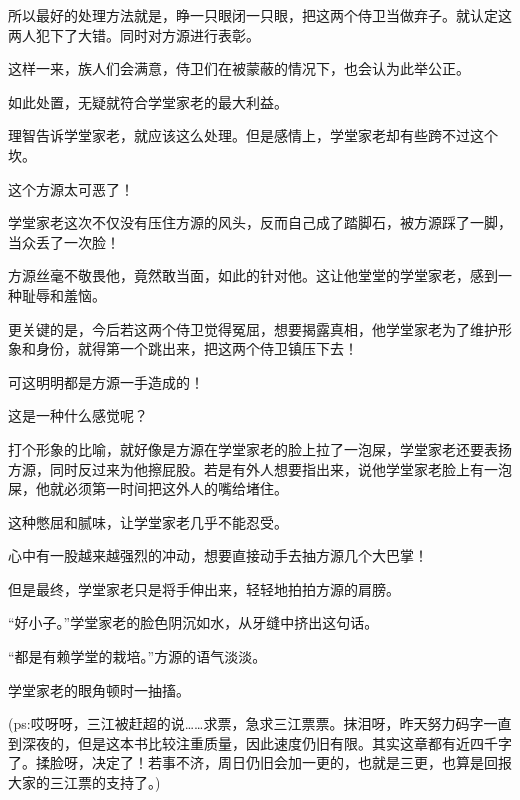 \begin{this_body}
所以最好的处理方法就是，睁一只眼闭一只眼，把这两个侍卫当做弃子。就认定这两人犯下了大错。同时对方源进行表彰。

这样一来，族人们会满意，侍卫们在被蒙蔽的情况下，也会认为此举公正。

如此处置，无疑就符合学堂家老的最大利益。

理智告诉学堂家老，就应该这么处理。但是感情上，学堂家老却有些跨不过这个坎。

这个方源太可恶了！

学堂家老这次不仅没有压住方源的风头，反而自己成了踏脚石，被方源踩了一脚，当众丢了一次脸！

方源丝毫不敬畏他，竟然敢当面，如此的针对他。这让他堂堂的学堂家老，感到一种耻辱和羞恼。

更关键的是，今后若这两个侍卫觉得冤屈，想要揭露真相，他学堂家老为了维护形象和身份，就得第一个跳出来，把这两个侍卫镇压下去！

可这明明都是方源一手造成的！

这是一种什么感觉呢？

打个形象的比喻，就好像是方源在学堂家老的脸上拉了一泡屎，学堂家老还要表扬方源，同时反过来为他擦屁股。若是有外人想要指出来，说他学堂家老脸上有一泡屎，他就必须第一时间把这外人的嘴给堵住。

这种憋屈和腻味，让学堂家老几乎不能忍受。

心中有一股越来越强烈的冲动，想要直接动手去抽方源几个大巴掌！

但是最终，学堂家老只是将手伸出来，轻轻地拍拍方源的肩膀。

“好小子。”学堂家老的脸色阴沉如水，从牙缝中挤出这句话。

“都是有赖学堂的栽培。”方源的语气淡淡。

学堂家老的眼角顿时一抽搐。

(ps:哎呀呀，三江被赶超的说……求票，急求三江票票。抹泪呀，昨天努力码字一直到深夜的，但是这本书比较注重质量，因此速度仍旧有限。其实这章都有近四千字了。揉脸呀，决定了！若事不济，周日仍旧会加一更的，也就是三更，也算是回报大家的三江票的支持了。)

\end{this_body}

